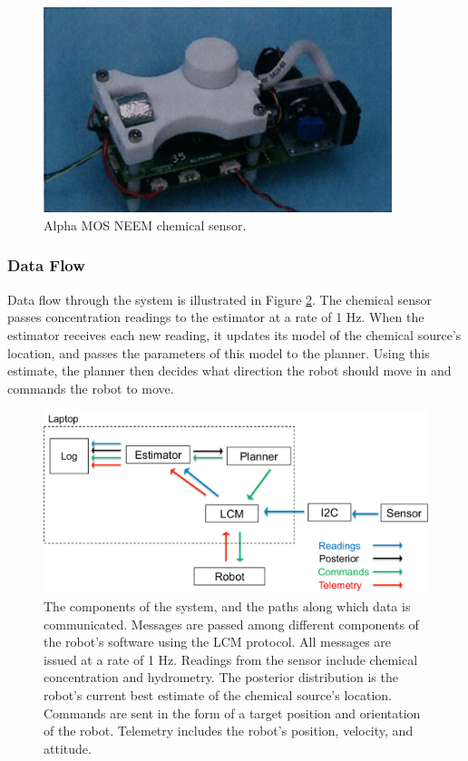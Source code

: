 \documentclass[submit, 12pt]{aiaa-pretty-modified}
\begin{document}
\begin{figure}
\begin{center}
\includegraphics[width=4in]{img/sensor.pdf}
\caption{Alpha MOS NEEM chemical sensor.}
\label{fig:sensor}
\end{center}
\end{figure}

\label{sec:mount}

\subsubsection{Data Flow}

Data flow through the system is illustrated in Figure \ref{fig:acquisition}. The
chemical sensor passes concentration readings to the estimator at a rate of 1
Hz. When the estimator receives each new reading, it updates its model of the
chemical source's location, and passes the
parameters of this model to the planner. Using this estimate, the planner then
decides what direction the robot should move in and commands the robot to move.

\begin{figure}
\begin{center}
\includegraphics[width=6in]{img/acquisition.pdf}
\caption[Data acquisition flowchart]{The components of the system, and the paths along which data is
  communicated. Messages are passed among different components of the robot's
  software using the LCM protocol. All messages are issued at a rate of 1 Hz.
  Readings from the sensor include chemical concentration and hydrometry. The
  posterior distribution is the robot's current best estimate of the chemical
  source's location. Commands are sent in the form of a target position and
  orientation of the robot. Telemetry includes the robot's position, velocity,
  and attitude.}
\label{fig:acquisition}
\end{center}
\end{figure}
\end{document}
